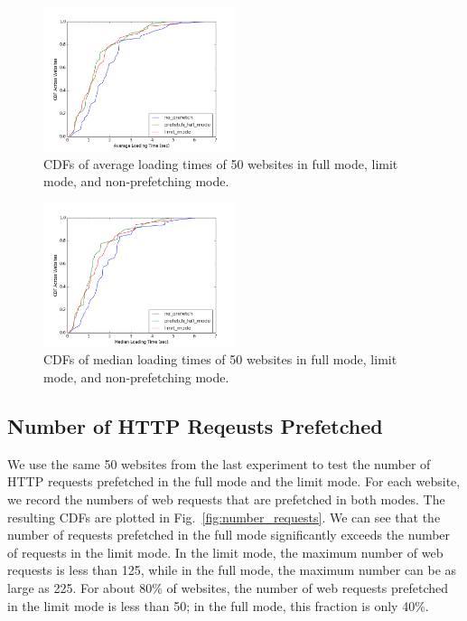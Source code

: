 
\begin{figure}[htbp] 
	\centering
	\includegraphics[width=0.5\textwidth]{average.png}  
	\caption{CDFs of average loading times of 50 websites in full mode, limit mode, and non-prefetching mode.}
	\label{fig:average}
\end{figure} 

\begin{figure}[htbp] 
	\centering
	\includegraphics[width=0.5\textwidth]{median.png}  
	\caption{CDFs of median loading times of 50 websites in full mode, limit mode, and non-prefetching mode.}
	\label{fig:median}
\end{figure} 


\subsection{Number of HTTP Reqeusts Prefetched}


We use the same 50 websites from the last experiment to test the number of HTTP requests prefetched in the full mode and the limit mode. For each website, we record the numbers of web requests that are prefetched in both modes. The resulting CDFs are plotted in Fig.~\ref{fig:number_requests}. We can see that the number of requests prefetched in the full mode significantly exceeds the number of requests in the limit mode. In the limit mode, the maximum number of web requests is less than 125, while in the full mode, the maximum number can be as large as 225. For about 80\% of websites, the number of web requests prefetched in the limit mode is less than 50; in the full mode, this fraction is only 40\%.

